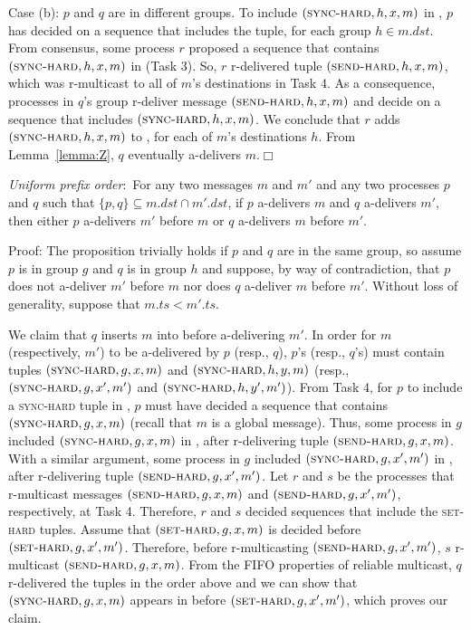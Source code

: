 Case (b): $p$ and $q$ are in different groups.
To include $(\textsc{sync-hard}, h, x, m)$ in \Buffer, $p$ has decided on a sequence that includes the tuple, for each group $h \in m.dst$.
From consensus, some process $r$ proposed a sequence that contains $(\textsc{sync-hard}, h, x, m)$ in \Pend (Task 3).
So, $r$ r-delivered tuple $(\textsc{send-hard}, h, x, m)$, which was r-multicast to all of $m$'s destinations in Task 4.
As a consequence, processes in $q$'s group r-deliver message $(\textsc{send-hard}, h, x, m)$ and decide on a sequence that includes $(\textsc{sync-hard}, h, x, m)$.
We conclude that $r$ adds $(\textsc{sync-hard}, h, x, m)$ to \Buffer, for each of $m$'s destinations $h$.
From Lemma~\ref{lemma:Z}, $q$ eventually a-delivers $m$.\hfill$\Box$


\begin{proposition}
\textit{Uniform prefix order}:~For any two messages $m$ and $m'$ and any two processes $p$ and $q$ such that $\lbrace p, q\rbrace \subseteq m.\mathit{dst} \cap m'.\mathit{dst}$, if $p$ a-delivers $m$ and $q$ a-delivers $m'$, then either $p$ a-delivers $m'$ before $m$ or $q$ a-delivers $m$ before $m'$.
\end{proposition}
\noindent
{\sc Proof:} 
The proposition trivially holds if $p$ and $q$ are in the same group, so assume $p$ is in group $g$ and $q$ is in group $h$ and suppose, by way of contradiction, that $p$ does not a-deliver $m'$ before $m$ nor does $q$ a-deliver $m$ before $m'$. 
Without loss of generality, suppose that $m.ts < m'.ts$. 

We claim that $q$ inserts $m$ into \Buffer before a-delivering $m'$. 
In order for $m$ (respectively, $m'$) to be a-delivered by $p$ (resp., $q$), $p$'s (resp., $q$'s) \Buffer must contain tuples $(\textsc{sync-hard}, g, x, m)$ and $(\textsc{sync-hard}, h, y, m)$ (resp., $(\textsc{sync-hard}, g, x', m')$ and $(\textsc{sync-hard}, h, y', m')$).
From Task 4, for $p$ to include a \textsc{sync-hard} tuple in \Buffer, $p$ must have decided a sequence that contains $(\textsc{sync-hard}, g, x, m)$ (recall that $m$ is a global message).
Thus, some process in $g$ included $(\textsc{sync-hard}, g, x, m)$ in \Pend, after r-delivering tuple  $(\textsc{send-hard}, g, x, m)$.
With a similar argument, some process in $g$ included $(\textsc{sync-hard}, g, x', m')$ in \Pend, after r-delivering tuple $(\textsc{send-hard}, g, x', m')$.
Let $r$ and $s$ be the processes that r-multicast messages $(\textsc{send-hard}, g, x, m)$ and $(\textsc{send-hard}, g, x', m')$, respectively, at Task 4.
Therefore, $r$ and $s$ decided sequences that include the \textsc{set-hard} tuples.
Assume that $(\textsc{set-hard}, g, x, m)$ is decided before $(\textsc{set-hard}, g, x', m')$.
Therefore, before r-multicasting $(\textsc{send-hard}, g, x', m')$, $s$ r-multicast $(\textsc{send-hard}, g, x, m)$.
From the FIFO properties of reliable multicast, $q$ r-delivered the tuples in the order above and we can show that $(\textsc{sync-hard}, g, x, m)$ appears in \Buffer before $(\textsc{set-hard}, g, x', m')$, which proves our claim.

